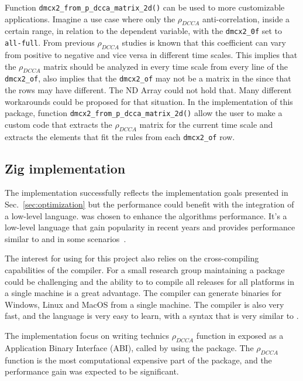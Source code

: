 \documentclass[article]{jss}
\begin{document}
Function \verb"dmcx2_from_p_dcca_matrix_2d()" can be used to more customizable applications. Imagine a use case where only the $\rho_{DCCA}$ anti-correlation, inside a certain range, in relation to the dependent variable, with the \verb"dmcx2_0f" set to \verb"all-full". From previous $\rho_{DCCA}$ studies is known that this coefficient can vary from positive to negative and vice  versa in different time scales. This implies that the $\rho_{DCCA}$ matrix should be analyzed in every time scale from every line of the \verb"dmcx2_of", also implies that the \verb"dmcx2_of" may not be a matrix in the since that the rows may have different. The  ND Array could not hold that. Many different workarounds could be proposed for that situation. In the implementation of this package, function \verb"dmcx2_from_p_dcca_matrix_2d()" allow the user to make a custom code that extracts the  $\rho_{DCCA}$ matrix for the current time scale and extracts the elements that fit the rules from each \verb"dmcx2_of" row.

\subsection{Zig implementation}

The  implementation successfully reflects the implementation goals presented in Sec.~\ref{sec:optimization} but the performance could benefit with the integration of a low-level language.  was chosen to enhance the algorithms performance. It's a low-level language that gain popularity in recent years and provides performance similar to  and  in some scenarios~\citep{10820804}.

The interest for using  for this project also relies on the cross-compiling capabilities of the  compiler. For a small research group maintaining a package could be challenging and the ability to to compile all releases for all platforms in a single machine is a great advantage. The  compiler can generate binaries for Windows, Linux and MacOS from a single machine. The  compiler is also very fast, and the language is very easy to learn, with a syntax that is very similar to .

The implementation focus on writing technics $\rho_{DCCA}$ function in  exposed as a  Application Binary Interface (ABI), called by  using the  package. The $\rho_{DCCA}$ function is the most computational expensive part of the package, and the performance gain was expected to be significant.
\end{document}
